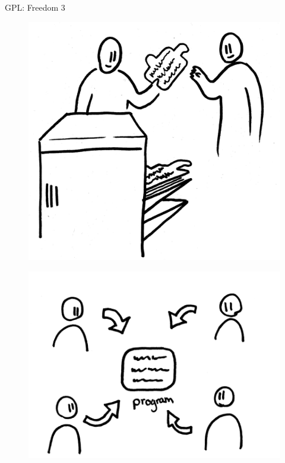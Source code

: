 \documentclass[notes,usenames,dvipsnames]{beamer}       %
\begin{document}
\begin{frame}{GPL: Freedom 3}
  \begin{figure}
    \centering
    \includegraphics[scale=0.3]{img/fr-redistribute-chages.png}
  \end{figure}
\end{frame}

\begin{frame}
  \begin{figure}
    \centering
    \includegraphics[scale=0.4]{img/user-control-program}
  \end{figure}
\end{frame}
\end{document}
